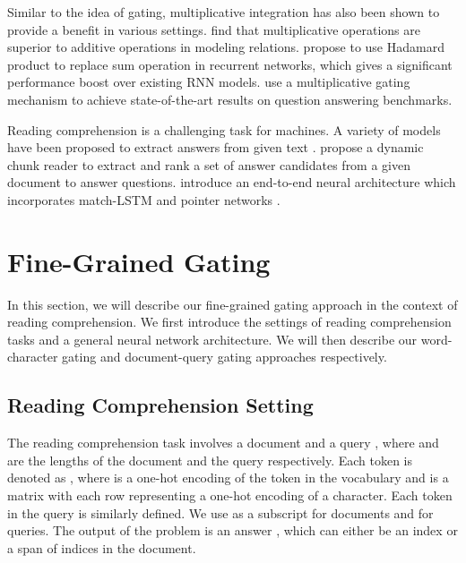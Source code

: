 \documentclass{article} \usepackage{iclr2017_conference,times}
\begin{document}
Similar to the idea of gating, multiplicative integration has also been shown to provide a benefit in various settings. \cite{yang2014learning} find that multiplicative operations are superior to additive operations in modeling relations. \cite{wu2016multiplicative} propose to use Hadamard product to replace sum operation in recurrent networks, which gives a significant performance boost over existing RNN models. \cite{dhingra2016gated} use a multiplicative gating mechanism to achieve state-of-the-art results on question answering benchmarks.

Reading comprehension is a challenging task for machines. A variety of models have been proposed to extract answers from given text \citep{hill2015goldilocks,kadlec2016text,trischler2016natural,chen2016thorough,sordoni2016iterative,cui2016attention}. \cite{yu2016chunk} propose a dynamic chunk reader to extract and rank a set of answer candidates from a given document to answer questions. \cite{wang2016machine} introduce an end-to-end neural architecture which incorporates match-LSTM and pointer networks \citep{vinyals2015pointer}.


 
\section{Fine-Grained Gating}

In this section, we will describe our fine-grained gating approach in the context of reading comprehension. We first introduce the settings of reading comprehension tasks and a general neural network architecture. We will then describe our word-character gating and document-query gating approaches respectively.

\subsection{Reading Comprehension Setting} \label{sec:setting}

The reading comprehension task involves a document  and a query , where  and  are the lengths of the document and the query respectively. Each token  is denoted as , where  is a one-hot encoding of the token in the vocabulary and  is a matrix with each row representing a one-hot encoding of a character. Each token in the query  is similarly defined. We use  as a subscript for documents and  for queries. The output of the problem is an answer , which can either be an index or a span of indices in the document.
\end{document}
